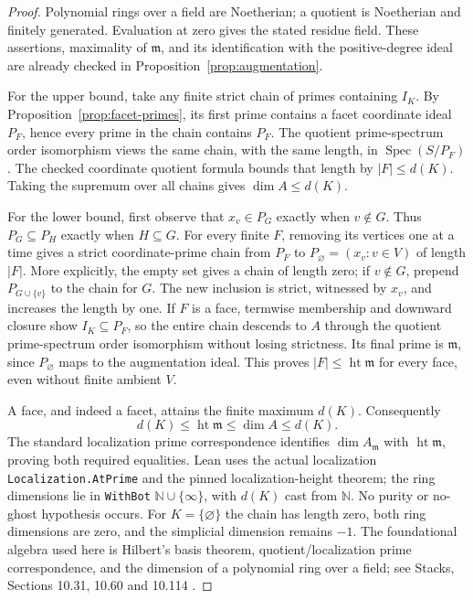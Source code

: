 \begin{proof}
\leanok
Polynomial rings over a field are Noetherian; a quotient is Noetherian and
finitely generated. Evaluation at zero gives the stated residue field.
These assertions, maximality of $\mathfrak m$, and its identification with
the positive-degree ideal are already checked in
Proposition~\ref{prop:augmentation}.

For the upper bound, take any finite strict chain of primes containing
$I_K$. By Proposition~\ref{prop:facet-primes}, its first prime contains a
facet coordinate ideal $P_F$, hence every prime in the chain contains $P_F$.
The quotient prime-spectrum order isomorphism views the same chain, with
the same length, in $\operatorname{Spec}(S/P_F)$. The checked coordinate
quotient formula bounds that length by $|F|\leq d(K)$. Taking the supremum
over all chains gives $\dim A\leq d(K)$.

For the lower bound, first observe that $x_v\in P_G$ exactly when
$v\notin G$. Thus $P_G\subseteq P_H$ exactly when $H\subseteq G$.
For every finite $F$, removing its vertices one at a time gives a strict
coordinate-prime chain from $P_F$ to $P_{\varnothing}=(x_v:v\in V)$ of
length $|F|$. More explicitly, the empty set gives a chain of length zero;
if $v\notin G$, prepend $P_{G\cup\{v\}}$ to the chain for $G$.
The new inclusion is strict, witnessed by $x_v$, and increases the length
by one. If $F$ is a face, termwise membership and downward closure show
$I_K\subseteq P_F$, so the entire chain descends to $A$ through the
quotient prime-spectrum order isomorphism without losing strictness.
Its final prime is $\mathfrak m$, since $P_{\varnothing}$ maps to the
augmentation ideal. This proves $|F|\leq\operatorname{ht}\mathfrak m$
for every face, even without finite ambient $V$.

A face, and indeed a facet, attains the finite maximum $d(K)$. Consequently
\[
 d(K)\leq\operatorname{ht}\mathfrak m\leq\dim A\leq d(K).
\]
The standard localization prime correspondence identifies
$\dim A_{\mathfrak m}$ with $\operatorname{ht}\mathfrak m$, proving both
required equalities. Lean uses the actual localization
\texttt{Localization.AtPrime} and the pinned localization-height theorem;
the ring dimensions lie in \texttt{WithBot} $\mathbb N\cup\{\infty\}$,
with $d(K)$ cast from $\mathbb N$. No purity or no-ghost hypothesis occurs.
For $K=\{\varnothing\}$ the chain has length zero, both ring dimensions
are zero, and the simplicial dimension remains $-1$.
The foundational algebra used here is Hilbert's basis theorem,
quotient/localization prime correspondence, and the dimension of a polynomial
ring over a field; see Stacks, Sections 10.31, 10.60 and 10.114
\cite{stacks-dimension}.
\end{proof}

